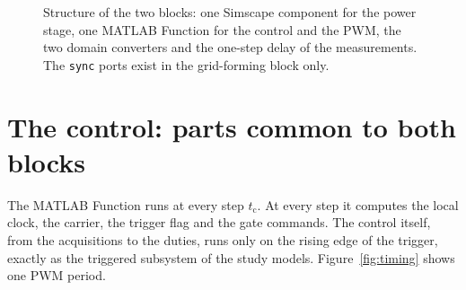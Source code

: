 \documentclass[11pt,a4paper]{scrartcl}
\newcommand{\ped}[1]{_{\mathrm{#1}}}
\newcommand{\code}[1]{\texttt{#1}}
\begin{document}
\begin{onehalfspace}
\begin{figure}[H]
	\captionsetup{width=0.85\textwidth, font=small}
	\caption[Structure of the blocks.]{Structure of the two blocks: one Simscape component for the power stage, one MATLAB Function for the control and the PWM, the two domain converters and the one-step delay of the measurements. The \code{sync} ports exist in the grid-forming block only.}
	\label{fig:block}
\end{figure}

\section{The control: parts common to both blocks}
\label{sec:common}

The MATLAB Function runs at every step $t\ped{c}$. At every step it computes the local clock, the carrier, the trigger flag and the gate commands. The control itself, from the acquisitions to the duties, runs only on the rising edge of the trigger, exactly as the triggered subsystem of the study models. Figure~\ref{fig:timing} shows one PWM period.


\end{onehalfspace}
\end{document}
